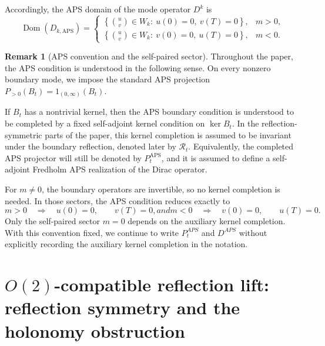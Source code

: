 \documentclass[11pt]{article}
\theoremstyle{definition}
\newtheorem{remark}[remark]{Remark}
\DeclareMathOperator{\APS}{APS}
\DeclareMathOperator{\Dom}{Dom} \newcommand{\Z}{\mathbb{Z}} \DeclareMathOperator{\Ran}{Ran}
\numberwithin{equation}{section}
\begin{document}
Accordingly, the APS domain of the mode operator \(D^{k}\) is
\begin{equation}\label{eq:DomDkAPS}
\Dom(D_{k,\text{APS}})
=
\begin{cases}
\displaystyle\left\{\binom{u}{v}\in W_k:\ u(0)=0,\ v(T)=0\right\},& m>0,\\[1em]
\displaystyle\left\{\binom{u}{v}\in W_k:\ v(0)=0,\ u(T)=0\right\},& m<0.
\end{cases}
\end{equation}


\begin{remark}[APS convention and the self-paired sector]
\label{rem:global_APS_convention}
Throughout the paper, the APS condition is understood in the following sense. On every
nonzero boundary mode, we impose the standard APS projection
\(P_{>0}(B_t)=1_{(0,\infty)}(B_t)\).

If \(B_t\) has a nontrivial kernel, then the APS boundary condition is understood to be completed
by a fixed self-adjoint kernel condition on \(\ker B_t\). In the reflection-symmetric parts of the
paper, this kernel completion is assumed to be invariant under the boundary reflection, denoted later by \(\mathcal R_t\).
Equivalently, the completed APS projector will still be denoted by \(P_t^{\APS}\), and it is assumed
to define a self-adjoint Fredholm APS realization of the Dirac operator.

For \(m\neq 0\), the boundary operators are invertible, so no kernel completion is needed. In
those sectors, the APS condition reduces exactly to
\begin{subequations}
\begin{equation}
m>0
\quad\Longrightarrow\quad
u(0)=0,\qquad v(T)=0,
\end{equation}
and
\begin{equation}
m<0
\quad\Longrightarrow\quad
v(0)=0,\qquad u(T)=0.
\end{equation}
\end{subequations}
Only the self-paired sector \(m=0\) depends on the auxiliary kernel completion. With this convention fixed, we continue to write \(P_t^{APS}\) and \(D^{APS}\) without explicitly
recording the auxiliary kernel completion in the notation.
\end{remark}




\section{$O(2)$-compatible reflection lift: reflection symmetry and the holonomy obstruction}
\label{sec:O2lift}
\end{document}

